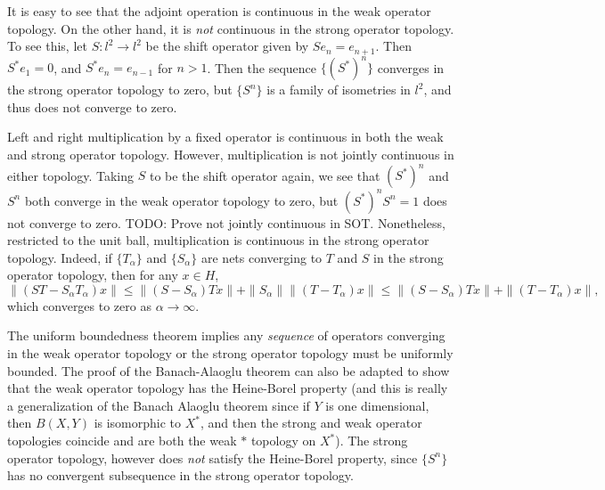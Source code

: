 It is easy to see that the adjoint operation is continuous in the weak operator topology. On the other hand, it is \emph{not} continuous in the strong operator topology. To see this, let $S: l^2 \to l^2$ be the shift operator given by $Se_n = e_{n+1}$. Then $S^*e_1 = 0$, and $S^*e_n = e_{n-1}$ for $n > 1$. Then the sequence $\{ (S^*)^n \}$ converges in the strong operator topology to zero, but $\{ S^n \}$ is a family of isometries in $l^2$, and thus does not converge to zero.

Left and right multiplication by a fixed operator is continuous in both the weak and strong operator topology. However, multiplication is not jointly continuous in either topology. Taking $S$ to be the shift operator again, we see that $(S^*)^n$ and $S^n$ both converge in the weak operator topology to zero, but $(S^*)^n S^n = 1$ does not converge to zero. TODO: Prove not jointly continuous in SOT. Nonetheless, restricted to the unit ball, multiplication is continuous in the strong operator topology. Indeed, if $\{ T_\alpha \}$ and $\{ S_\alpha \}$ are nets converging to $T$ and $S$ in the strong operator topology, then for any $x \in H$,
%
\[ \| (ST - S_\alpha T_\alpha) x \| \leq \| (S - S_\alpha) T x \| + \| S_\alpha \| \| (T - T_\alpha) x \| \leq \| (S - S_\alpha) Tx \| + \| (T - T_\alpha) x \|, \]
%
which converges to zero as $\alpha \to \infty$.

The uniform boundedness theorem implies any \emph{sequence} of operators converging in the weak operator topology or the strong operator topology must be uniformly bounded. The proof of the Banach-Alaoglu theorem can also be adapted to show that the weak operator topology has the Heine-Borel property (and this is really a generalization of the Banach Alaoglu theorem since if $Y$ is one dimensional, then $B(X,Y)$ is isomorphic to $X^*$, and then the strong and weak operator topologies coincide and are both the weak $*$ topology on $X^*$). The strong operator topology, however does \emph{not} satisfy the Heine-Borel property, since $\{ S^n \}$ has no convergent subsequence in the strong operator topology.

